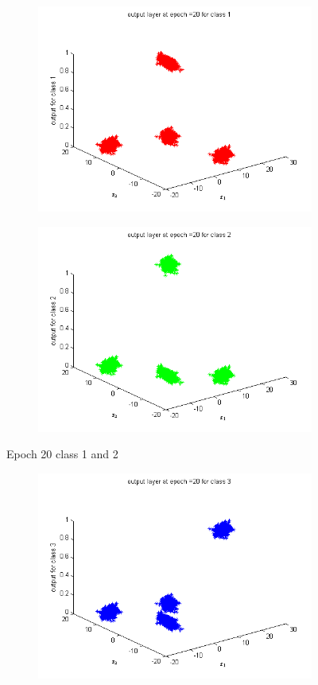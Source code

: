 \documentclass{article}
\begin{document}
\begin{flushleft}
\begin{figure}
\begin{subfigure}{.5\textwidth}
  \centering
  \includegraphics[width=.8\linewidth]{Classification/linearlySeparable/20_1}
 
\end{subfigure}%
\begin{subfigure}{.5\textwidth}
  \centering
  \includegraphics[width=.8\linewidth]{Classification/linearlySeparable/20_2}
  
\end{subfigure}
\caption{Epoch 20 class 1 and 2}
\end{figure}

\begin{figure}
\begin{subfigure}{.5\textwidth}
  \centering
  \includegraphics[width=.8\linewidth]{Classification/linearlySeparable/20_3}
 

\end{subfigure}
\end{figure}
\end{flushleft}
\end{document}
